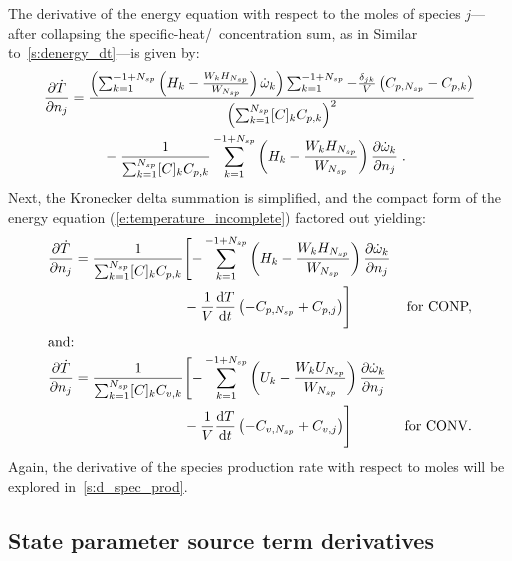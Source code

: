 \documentclass[12pt,number,sort&compress]{elsarticle}
\begin{document}
The derivative of the energy equation with respect to the moles of species $j$---after collapsing the specific-heat\slash~concentration sum, as in Similar to~\cref{s:denergy_dt}---is given by:
\begin{align}
 \frac{\partial\dot{T}}{\partial{n_j}} &= \frac{\left(\sum_{k=1}^{-1 + \ns/} \left(H_{k} - \frac{W_{k} H_{\ns/}}{W_{\ns/}}\right) \dot{\omega}_{k}\right) \sum_{k=1}^{-1 + \ns/} - \frac{\delta_{j k}}{V} \left({C_{p, \ns/}} - {C_{p, k}}\right)}{\left(\sum_{k=1}^{\ns/} [C]_{k} {C_{p, k}}\right)^{2}} \nonumber \\
				       & \mathindent - \frac{1}{\sum_{k=1}^{\ns/} [C]_{k} {C_{p, k}}} \sum_{k=1}^{-1 + \ns/} \left(H_{k} - \frac{W_{k} H_{\ns/}}{W_{\ns/}}\right) \frac{\partial \dot{\omega}_{k} }{\partial {n_j} }\;.
\end{align}
Next, the Kronecker delta summation is simplified, and the compact form of the energy equation (\cref{e:temperature_incomplete}) factored out yielding:
\begin{subequations}
\label{e:dTdotdnj_nojac}
\begin{align}
 \frac{\partial\dot{T}}{\partial{n_j}} &= \frac{1}{\sum_{k=1}^{\ns/} [C]_{k} {C_{p, k}}} \Biggl[- \sum_{k=1}^{-1 + \ns/} \left(H_{k} - \frac{W_{k} H_{\ns/}}{W_{\ns/}}\right) \frac{\partial \dot{\omega}_{k} }{\partial {n_j} } & \nonumber \\
				       &  \mathindent[largerindentands] - \frac{1}{V} \frac{\text{d} T }{\text{d} t } \left(- {C_{p, \ns/}} + {C_{p, j}}\right)\Biggr] & \text{\dconp/,} \\
\intertext{and:}
 \frac{\partial\dot{T}}{\partial{n_j}} &= \frac{1}{\sum_{k=1}^{\ns/} [C]_{k} {C_{v, k}}} \Biggl[- \sum_{k=1}^{-1 + \ns/} \left(U_{k} - \frac{W_{k} U_{\ns/}}{W_{\ns/}}\right) \frac{\partial \dot{\omega}_{k} }{\partial {n_j} } & \nonumber \\
				       & \mathindent[largerindentands] - \frac{1}{V} \frac{\text{d} T }{\text{d} t } \left(- {C_{v, \ns/}} + {C_{v, j}}\right) \Biggr] & \text{\dconv/.}
\end{align}
\end{subequations}
Again, the derivative of the species production rate with respect to moles will be explored in~\cref{s:d_spec_prod}.

\subsection{State parameter source term derivatives}
\label{s:parameter_source_derivatives}
\end{document}
